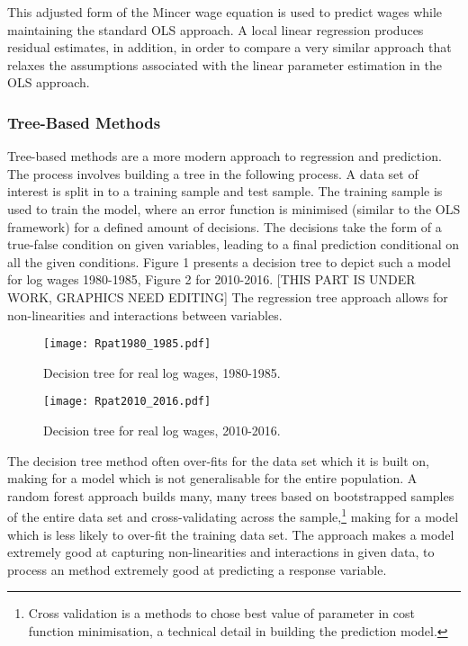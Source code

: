 \documentclass[notitlepage,12pt]{article}
\begin{document}
This adjusted form of the Mincer wage equation is used to predict wages while maintaining the standard OLS approach.  A local linear regression produces residual estimates, in addition, in order to compare a very similar approach that relaxes the assumptions associated with the linear parameter estimation in the OLS approach.

\subsubsection{Tree-Based Methods}

Tree-based methods are a more modern approach to regression and prediction.  The process involves building a tree in the following process.  A data set of interest is split in to a training sample and test sample.  The training sample is used to train the model, where an error function is minimised (similar to the OLS framework) for a defined amount of decisions.  The decisions take the form of a true-false condition on given variables, leading to a final prediction conditional on all the given conditions.  Figure 1 presents a decision tree to depict such a model for log wages 1980-1985, Figure 2 for 2010-2016.  [THIS PART IS UNDER WORK, GRAPHICS NEED EDITING]  The regression tree approach allows for non-linearities and interactions between variables. 
\begin{figure}[H]
  \centering
  \caption{Decision tree for real log wages, 1980-1985.}
  \texttt{[image: Rpat1980\_1985.pdf]}
\end{figure}

\begin{figure}[H]
  \centering
  \caption{Decision tree for real log wages, 2010-2016.}
  \texttt{[image: Rpat2010\_2016.pdf]}
\end{figure}

The decision tree method often over-fits for the data set which it is built on, making for a model which is not generalisable for the entire population.  A random forest approach builds many, many trees based on bootstrapped samples of the entire data set and cross-validating across the sample,\footnote{Cross validation is a methods to chose best value of parameter in cost function minimisation, a technical detail in building the prediction model.} making for a model which is less likely to over-fit the training data set.  The approach makes a model extremely good at capturing non-linearities and interactions in given data, to process an method extremely good at predicting a response variable.
\end{document}
